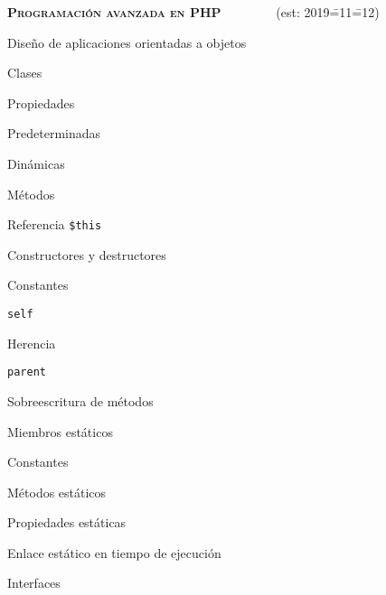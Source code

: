 \begin{longenum}
\begin{longenum}
\begin{longenum}
\begin{longenum}
            \end{longenum}
        \end{longenum}
    \end{longenum}
    \item \textbf{\textsc{Programación avanzada en PHP}} \ \ \ \ \ \ \ \ (est: 2019\==11\==12)
    \begin{longenum}
        \item Diseño de aplicaciones orientadas a objetos
        \begin{longenum}
            \item Clases
            \item Propiedades
            \begin{longenum}
                \item Predeterminadas
                \item Dinámicas
            \end{longenum}
            \item Métodos
            \begin{longenum}
                \item Referencia \texttt{\$this}
                \item Constructores y destructores
            \end{longenum}
            \item Constantes
            \begin{longenum}
                \item \texttt{self}
            \end{longenum}
            \item Herencia
            \begin{longenum}
                \item \texttt{parent}
                \item Sobreescritura de métodos
            \end{longenum}
            \item Miembros estáticos
            \begin{longenum}
                \item Constantes
                \item Métodos estáticos
                \item Propiedades estáticas
                \item Enlace estático en tiempo de ejecución
            \end{longenum}
            \item Interfaces

\end{longenum}
\end{longenum}
\end{longenum}
